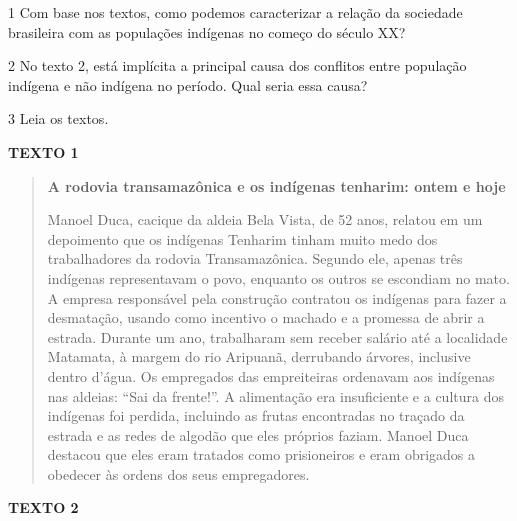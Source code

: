 \num{1} Com base nos textos, como podemos caracterizar a relação da
sociedade brasileira com as populações indígenas no começo do século XX?


\num{2} No texto 2, está implícita a principal causa dos conflitos entre
população indígena e não indígena no período. Qual seria essa causa?


\num{3} Leia os textos.

\textbf{TEXTO 1}

\begin{quote}
\textbf{A rodovia transamazônica e os indígenas tenharim: ontem e hoje}

Manoel Duca, cacique da aldeia Bela Vista, de 52 anos, relatou em um
depoimento que os indígenas Tenharim tinham muito medo dos trabalhadores
da rodovia Transamazônica. Segundo ele, apenas três indígenas
representavam o povo, enquanto os outros se escondiam no mato. A empresa
responsável pela construção contratou os indígenas para fazer a
desmatação, usando como incentivo o machado e a promessa de abrir a
estrada. Durante um ano, trabalharam sem receber salário até a
localidade Matamata, à margem do rio Aripuanã, derrubando árvores,
inclusive dentro d'água. Os empregados das empreiteiras ordenavam aos
indígenas nas aldeias: ``Sai da frente!''. A alimentação era
insuficiente e a cultura dos indígenas foi perdida, incluindo as frutas
encontradas no traçado da estrada e as redes de algodão que eles
próprios faziam. Manoel Duca destacou que eles eram tratados como
prisioneiros e eram obrigados a obedecer às ordens dos seus
empregadores.

\end{quote}

\textbf{TEXTO 2}


